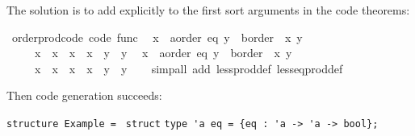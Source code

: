 \begin{isabellebody}
\begin{isamarkuptext}
  The solution is to add  explicitly to the first sort arguments in the
  code theorems:%
\end{isamarkuptext}%
\isamarkuptrue%
%
\isadelimquoteme
%
\endisadelimquoteme
%
\isatagquoteme
{}\isamarkupfalse%
\ order{\isacharunderscore}prod{\isacharunderscore}code\ {\isacharbrackleft}code\ func{\isacharbrackright}{\isacharcolon}\isanewline
\ \ {\isachardoublequoteopen}{\isacharparenleft}x{}\ {\isasymColon}\ {\isacharprime}a{\isasymColon}{\isacharbraceleft}order{\isacharcomma}\ eq{\isacharbraceright}{\isacharcomma}\ y{}\ {\isasymColon}\ {\isacharprime}b{\isasymColon}order{\isacharparenright}\ {\isacharless}\ {\isacharparenleft}x{}{\isacharcomma}\ y{}{\isacharparenright}\ {\isasymlongleftrightarrow}\isanewline
\ \ \ \ \ x{}\ {\isacharless}\ x{}\ {\isasymor}\ x{}\ {\isacharequal}\ x{}\ {\isasymand}\ y{}\ {\isacharless}\ y{}{\isachardoublequoteclose}\isanewline
\ \ {\isachardoublequoteopen}{\isacharparenleft}x{}\ {\isasymColon}\ {\isacharprime}a{\isasymColon}{\isacharbraceleft}order{\isacharcomma}\ eq{\isacharbraceright}{\isacharcomma}\ y{}\ {\isasymColon}\ {\isacharprime}b{\isasymColon}order{\isacharparenright}\ {\isasymle}\ {\isacharparenleft}x{}{\isacharcomma}\ y{}{\isacharparenright}\ {\isasymlongleftrightarrow}\isanewline
\ \ \ \ \ x{}\ {\isacharless}\ x{}\ {\isasymor}\ x{}\ {\isacharequal}\ x{}\ {\isasymand}\ y{}\ {\isasymle}\ y{}{\isachardoublequoteclose}\isanewline
\ \ \isamarkupfalse%
\ {\isacharparenleft}simp{\isacharunderscore}all\ add{\isacharcolon}\ less{\isacharunderscore}prod{\isacharunderscore}def\ less{\isacharunderscore}eq{\isacharunderscore}prod{\isacharunderscore}def{\isacharparenright}%
\endisatagquoteme
{\isafoldquoteme}%
%
\isadelimquoteme
%
\endisadelimquoteme
%
\begin{isamarkuptext}%
\noindent Then code generation succeeds:%
\end{isamarkuptext}%
\isamarkuptrue%
%
\isadelimquoteme
%
\endisadelimquoteme
%
\isatagquoteme
%
\begin{isamarkuptext}%
\isaverbatim%
\noindent%
\verb|structure Example = |\newline%
\verb|struct|\newline%
\newline%
\verb|type 'a eq = {eq : 'a -> 'a -> bool};|\newline%

\end{isamarkuptext}
\end{isabellebody}
